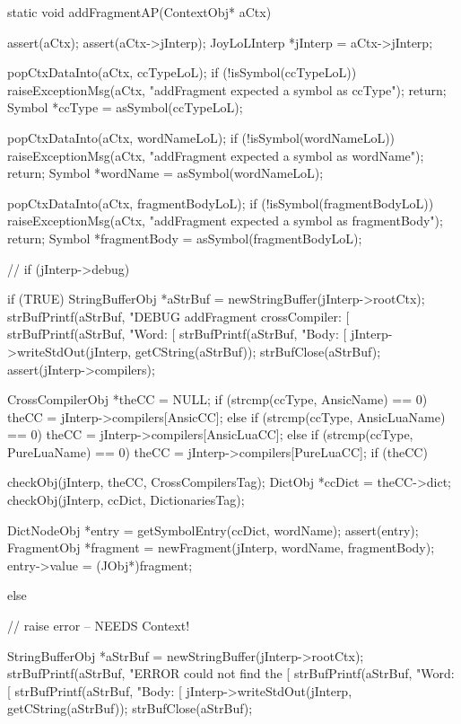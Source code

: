 {\startTestSuite[addFragment]

\startCCode
static void addFragmentAP(ContextObj* aCtx) {
  assert(aCtx);
  assert(aCtx->jInterp);
  JoyLoLInterp *jInterp = aCtx->jInterp;

  popCtxDataInto(aCtx, ccTypeLoL);
  if (!isSymbol(ccTypeLoL)) {
    raiseExceptionMsg(aCtx,
      "addFragment expected a symbol as ccType");
    return;
  }
  Symbol *ccType = asSymbol(ccTypeLoL);
  
  popCtxDataInto(aCtx, wordNameLoL);
  if (!isSymbol(wordNameLoL)) {
    raiseExceptionMsg(aCtx,
      "addFragment expected a symbol as wordName");
    return;
  }
  Symbol *wordName = asSymbol(wordNameLoL);
  
  popCtxDataInto(aCtx, fragmentBodyLoL);
  if (!isSymbol(fragmentBodyLoL)) {
    raiseExceptionMsg(aCtx,
      "addFragment expected a symbol as fragmentBody");
    return;
  }
  Symbol *fragmentBody = asSymbol(fragmentBodyLoL);
  
//  if (jInterp->debug) {
  if (TRUE) {
    StringBufferObj *aStrBuf = newStringBuffer(jInterp->rootCtx);
    strBufPrintf(aStrBuf, 
      "DEBUG addFragment crossCompiler: [%
    strBufPrintf(aStrBuf, "Word: [%
    strBufPrintf(aStrBuf, "Body: [%
    jInterp->writeStdOut(jInterp, getCString(aStrBuf));
    strBufClose(aStrBuf);
  }
  assert(jInterp->compilers);

  CrossCompilerObj *theCC = NULL;
  if (strcmp(ccType, AnsicName) == 0) {
    theCC = jInterp->compilers[AnsicCC];
  } else if (strcmp(ccType, AnsicLuaName) == 0) {
    theCC = jInterp->compilers[AnsicLuaCC];
  } else if (strcmp(ccType, PureLuaName) == 0) {
    theCC = jInterp->compilers[PureLuaCC];
  }
  if (theCC) {
    checkObj(jInterp, theCC, CrossCompilersTag);
    DictObj *ccDict = theCC->dict;
    checkObj(jInterp, ccDict, DictionariesTag);
    
    DictNodeObj *entry = getSymbolEntry(ccDict, wordName);
    assert(entry);
    FragmentObj *fragment =
      newFragment(jInterp, wordName, fragmentBody);
    entry->value = (JObj*)fragment;
  } else {
    // raise error -- NEEDS Context!
    
    StringBufferObj *aStrBuf = newStringBuffer(jInterp->rootCtx);
    strBufPrintf(aStrBuf, 
      "ERROR could not find the [%
    strBufPrintf(aStrBuf, "Word: [%
    strBufPrintf(aStrBuf, "Body: [%
    jInterp->writeStdOut(jInterp, getCString(aStrBuf));
    strBufClose(aStrBuf);
  }
}
\stopCCode

}}
